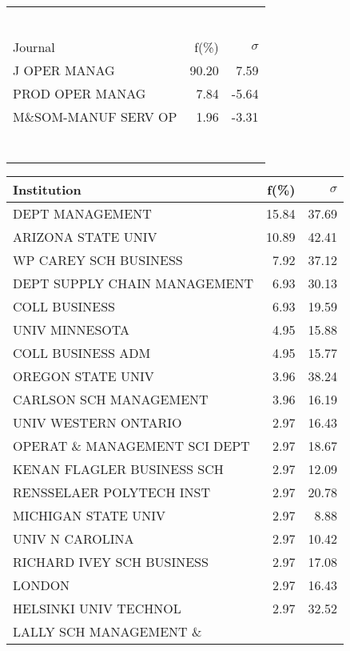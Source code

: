 \documentclass[a4paper,11pt]{report}
\begin{document}
\begin{landscape}
\begin{table}[!ht]
{\begin{tabular}{|l r  r|}
 &  & \\
 &  & \\
 &  & \\
 &  & \\
 &  & \\
 &  & \\
\hline
\hline
Journal & f(\%) & $\sigma$\\
\hline
J OPER MANAG & 90.20 & 7.59\\
PROD OPER MANAG & 7.84 & -5.64\\
M\&SOM-MANUF SERV OP & 1.96 & -3.31\\
 &  & \\
 &  & \\
 &  & \\
 &  & \\
 &  & \\
 &  & \\
 &  & \\
\hline
\end{tabular}
}
{\scriptsize\begin{tabular}{|l r r|}
\hline
Institution & f(\%) & $\sigma$\\
\hline
DEPT MANAGEMENT & 15.84 & 37.69\\
ARIZONA STATE UNIV & 10.89 & 42.41\\
WP CAREY SCH BUSINESS & 7.92 & 37.12\\
DEPT SUPPLY CHAIN MANAGEMENT & 6.93 & 30.13\\
COLL BUSINESS & 6.93 & 19.59\\
UNIV MINNESOTA & 4.95 & 15.88\\
COLL BUSINESS ADM & 4.95 & 15.77\\
OREGON STATE UNIV & 3.96 & 38.24\\
CARLSON SCH MANAGEMENT & 3.96 & 16.19\\
UNIV WESTERN ONTARIO & 2.97 & 16.43\\
OPERAT \& MANAGEMENT SCI DEPT & 2.97 & 18.67\\
KENAN FLAGLER BUSINESS SCH & 2.97 & 12.09\\
RENSSELAER POLYTECH INST & 2.97 & 20.78\\
MICHIGAN STATE UNIV & 2.97 & 8.88\\
UNIV N CAROLINA & 2.97 & 10.42\\
RICHARD IVEY SCH BUSINESS & 2.97 & 17.08\\
LONDON & 2.97 & 16.43\\
HELSINKI UNIV TECHNOL & 2.97 & 32.52\\
LALLY SCH MANAGEMENT \& &  & \\

\end{tabular}}
\end{table}
\end{landscape}
\end{document}
